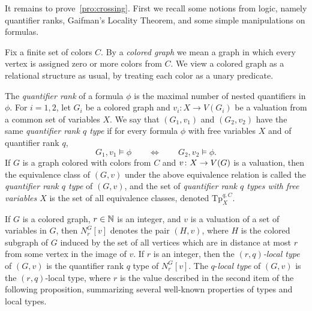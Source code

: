 It remains to prove~\cref{pro:crossing}. 
First we recall some notions from logic, namely quantifier ranks, Gaifman's Locality Theorem, and some simple manipulations on formulas.

 Fix a finite set of  colors $C$.
By a \emph{colored graph} we mean a graph  in which 
every vertex is assigned zero or more colors from $C$. We view a colored graph as a relational structure as usual, by treating each color as a unary predicate. 

The \emph{quantifier rank} of a formula $\phi$ is the maximal number of nested quantifiers in $\phi$.
For $i=1,2$, let $G_i$
be a colored graph and $v_i:X\to V(G_i)$ be a valuation
from a common set of variables $X$.
We say that $(G_1, v_1)$ and $(G_2,v_2)$
have the same \emph{quantifier rank $q$ type} %
if for every formula $\phi$ with  free variables $X$ and of quantifier rank $q$,
 $$G_1,v_1\models \phi\qquad\iff \qquad G_2,v_2\models \phi.$$
If $G$ is a graph colored with colors from $C$ and 
 $v\colon X\to V(G)$ is a valuation, 
then the equivalence class of $(G, v)$ under the above equivalence relation is called the \emph{quantifier rank $q$ type} of $(G,v)$, and  the set of \emph{quantifier rank $q$ types with  free variables $X$}
is the set of all equivalence classes, denoted
$\mathrm{Tp}^{q,C}_X$.

 If $G$ is a colored graph, $r\in\mathbb{N}$ is an integer, and $v$ is a valuation of a set of variables in $G$, then  $N^G_r[v]$ denotes the pair $(H,v)$, where $H$ is the colored subgraph of $G$
induced by the set of all vertices which are in distance at most $r$
from some vertex in the image of $v$.
If $r$ is an integer, then the \emph{$(r,q)$-local type} of $(G,v)$ is 
the quantifier rank $q$ type of $N^G_r[v]$. The $q$-\emph{local type} of $(G,v)$ is the $(r,q)$-local type, where $r$   is the value described in the second item of the following proposition,  summarizing several well-known properties of types and local types.


